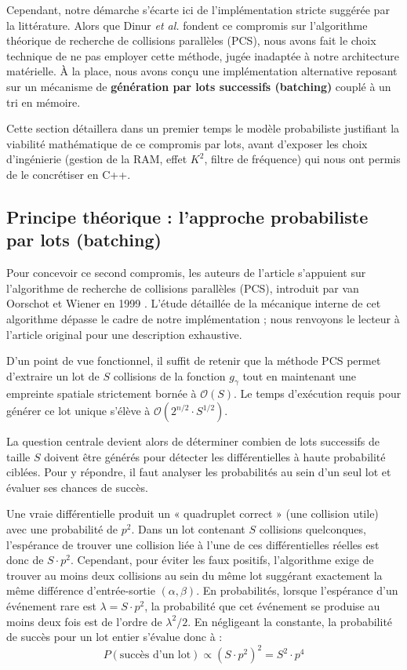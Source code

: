 \documentclass[a4paper,11pt]{article}
\begin{document}
Cependant, notre démarche s'écarte ici de l'implémentation stricte suggérée par la littérature. Alors que Dinur \textit{et al.} fondent ce compromis sur l'algorithme théorique de recherche de collisions parallèles (PCS), nous avons fait le choix technique de ne pas employer cette méthode, jugée inadaptée à notre architecture matérielle. À la place, nous avons conçu une implémentation alternative reposant sur un mécanisme de \textbf{génération par lots successifs (batching)} couplé à un tri en mémoire. 

Cette section détaillera dans un premier temps le modèle probabiliste justifiant la viabilité mathématique de ce compromis par lots, avant d'exposer les choix d'ingénierie (gestion de la RAM, effet $K^2$, filtre de fréquence) qui nous ont permis de le concrétiser en C++.

\subsection{Principe théorique : l'approche probabiliste par lots (batching)}

Pour concevoir ce second compromis, les auteurs de l'article s'appuient sur l'algorithme de recherche de collisions parallèles (PCS), introduit par van Oorschot et Wiener en 1999 \cite{OW99}. L'étude détaillée de la mécanique interne de cet algorithme dépasse le cadre de notre implémentation ; nous renvoyons le lecteur à l'article original pour une description exhaustive. 

D'un point de vue fonctionnel, il suffit de retenir que la méthode PCS permet d'extraire un lot de $S$ collisions de la fonction $g_{\gamma}$ tout en maintenant une empreinte spatiale strictement bornée à $\mathcal{O}(S)$. Le temps d'exécution requis pour générer ce lot unique s'élève à $\mathcal{O}(2^{n/2} \cdot S^{1/2})$.

La question centrale devient alors de déterminer combien de lots successifs de taille $S$ doivent être générés pour détecter les différentielles à haute probabilité ciblées. Pour y répondre, il faut analyser les probabilités au sein d'un seul lot et évaluer ses chances de succès.

Une vraie différentielle produit un « quadruplet correct » (une collision utile) avec une probabilité de $p^2$. Dans un lot contenant $S$ collisions quelconques, l'espérance de trouver une collision liée à l'une de ces différentielles réelles est donc de $S \cdot p^2$. Cependant, pour éviter les faux positifs, l'algorithme exige de trouver au moins deux collisions au sein du même lot suggérant exactement la même différence d'entrée-sortie $(\alpha, \beta)$. En probabilités, lorsque l'espérance d'un événement rare est $\lambda = S \cdot p^2$, la probabilité que cet événement se produise au moins deux fois est de l'ordre de $\lambda^2 / 2$. En négligeant la constante, la probabilité de succès pour un lot entier s'évalue donc à :
\begin{equation*}
    P(\text{succès d'un lot}) \propto (S \cdot p^2)^2 = S^2 \cdot p^4
\end{equation*}
\end{document}
